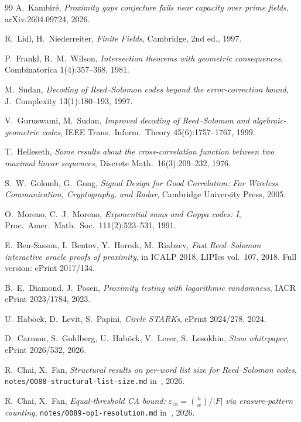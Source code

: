 \documentclass[11pt]{article}
\begin{document}
\begin{thebibliography}{99}
 A.~Kambir\'e, \emph{Proximity gaps conjecture fails near capacity over prime fields}, arXiv:2604.09724, 2026.

 R.~Lidl, H.~Niederreiter, \emph{Finite Fields}, Cambridge, 2nd ed., 1997.

 P.~Frankl, R.~M.~Wilson, \emph{Intersection theorems with geometric consequences}, Combinatorica 1(4):357--368, 1981.

 M.~Sudan, \emph{Decoding of Reed--Solomon codes beyond the error-correction bound}, J.~Complexity 13(1):180--193, 1997.

 V.~Guruswami, M.~Sudan, \emph{Improved decoding of Reed--Solomon and algebraic-geometric codes}, IEEE Trans.\ Inform.\ Theory 45(6):1757--1767, 1999.

 T.~Helleseth, \emph{Some results about the cross-correlation function between two maximal linear sequences}, Discrete Math.\ 16(3):209--232, 1976.

 S.~W.~Golomb, G.~Gong, \emph{Signal Design for Good Correlation: For Wireless Communication, Cryptography, and Radar}, Cambridge University Press, 2005.

 O.~Moreno, C.~J.~Moreno, \emph{Exponential sums and Goppa codes: I}, Proc.\ Amer.\ Math.\ Soc.\ 111(2):523--531, 1991.

 E.~Ben-Sasson, I.~Bentov, Y.~Horesh, M.~Riabzev, \emph{Fast Reed--Solomon interactive oracle proofs of proximity}, in ICALP 2018, LIPIcs vol.~107, 2018. Full version: ePrint 2017/134.

 B.~E.~Diamond, J.~Posen, \emph{Proximity testing with logarithmic randomness}, IACR ePrint 2023/1784, 2023.

 U.~Hab\"{o}ck, D.~Levit, S.~Papini, \emph{Circle STARKs}, ePrint 2024/278, 2024.

 D.~Carmon, S.~Goldberg, U.~Hab\"{o}ck, V.~Lerer, S.~Lesokhin, \emph{Stwo whitepaper}, ePrint 2026/532, 2026.

 R.~Chai, X.~Fan, \emph{Structural results on per-word list size for Reed--Solomon codes}, \texttt{notes/0088-structural-list-size.md} in~\cite{CompanionRepo}, 2026.

 R.~Chai, X.~Fan, \emph{Equal-threshold CA bound: $\varepsilon_{\mathrm{ca}} = \binom{n}{w}/|F|$ via erasure-pattern counting}, \texttt{notes/0089-op1-resolution.md} in~\cite{CompanionRepo}, 2026.


\end{thebibliography}
\end{document}
